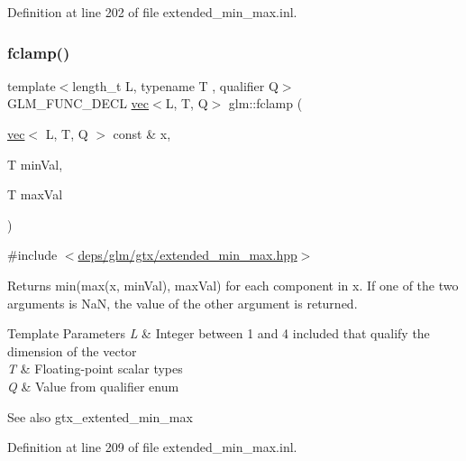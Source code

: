 Definition at line 202 of file extended\+\_\+min\+\_\+max.\+inl.

\mbox{\label{group__gtx__extended__min__max_ga60796d08903489ee185373593bc16b9d}} 
\subsubsection{\texorpdfstring{fclamp()}{fclamp()}\hspace{0.1cm}{\footnotesize\ttfamily [2/3]}}
{\footnotesize\ttfamily template$<$length\+\_\+t L, typename T , qualifier Q$>$ \\
G\+L\+M\+\_\+\+F\+U\+N\+C\+\_\+\+D\+E\+CL \hyperlink{structglm_1_1vec}{vec}$<$L, T, Q$>$ glm\+::fclamp (\begin{DoxyParamCaption}\item[{\hyperlink{structglm_1_1vec}{vec}$<$ L, T, Q $>$ const \&}]{x,  }\item[{T}]{min\+Val,  }\item[{T}]{max\+Val }\end{DoxyParamCaption})}



{\ttfamily \#include $<$\hyperlink{extended__min__max_8hpp}{deps/glm/gtx/extended\+\_\+min\+\_\+max.\+hpp}$>$}

Returns min(max(x, min\+Val), max\+Val) for each component in x. If one of the two arguments is NaN, the value of the other argument is returned.


\begin{DoxyTemplParams}{Template Parameters}
{\em L} & Integer between 1 and 4 included that qualify the dimension of the vector \\
\hline
{\em T} & Floating-\/point scalar types \\
\hline
{\em Q} & Value from qualifier enum\\
\hline
\end{DoxyTemplParams}
\begin{DoxySeeAlso}{See also}
gtx\+\_\+extented\+\_\+min\+\_\+max 
\end{DoxySeeAlso}


Definition at line 209 of file extended\+\_\+min\+\_\+max.\+inl.

